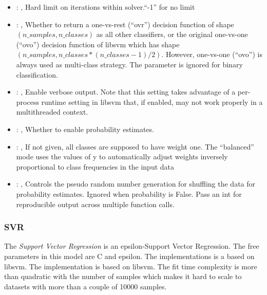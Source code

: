 \begin{itemize}
    \item {}: , 
      Hard limit on iterations within solver.``-1'' for no limit

    \item {}: , 
      Whether to return a one-vs-rest (``ovr'') decision function of shape $(n\_samples, n\_classes)$
      as                                                            all other classifiers, or the
      original one-vs-one (``ovo'') decision function of libsvm which has
      shape $(n\_samples, n\_classes * (n\_classes - 1) / 2)$. However, one-vs-one (``ovo'') is always
      used as                                                            multi-class strategy. The
      parameter is ignored for binary classification.

    \item {}: , 
      Enable verbose output. Note that this setting takes advantage
      of a per-process runtime setting in libsvm that, if enabled, may not
      work properly in a multithreaded context.

    \item {}: , 
      Whether to enable probability estimates.

    \item {}: \xmlDesc{[balanced]}, 
      If not given, all classes are supposed to have weight one.
      The “balanced” mode uses the values of y to automatically adjust weights
      inversely proportional to class frequencies in the input data

    \item {}: , 
      Controls the pseudo random number generation for shuffling
      the data for probability estimates. Ignored when probability is False.
      Pass an int for reproducible output across multiple function calls.
  \end{itemize}


\subsubsection{SVR}
  The  \textit{Support Vector Regression} is an epsilon-Support Vector Regression.
  The free parameters in this model are C and epsilon. The implementations is a based on libsvm.
  The implementation is based on libsvm. The fit time complexity                             is more
  than quadratic with the number of samples which makes it hard                             to scale
  to datasets with more than a couple of 10000 samples.

